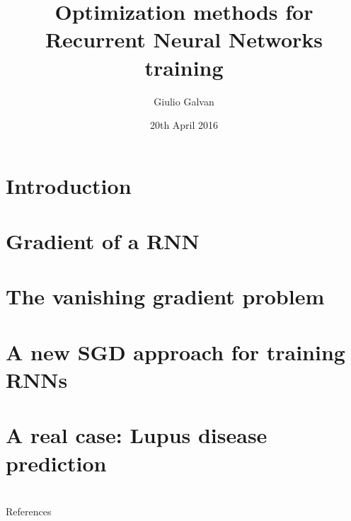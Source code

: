 \documentclass[xcolor=dvipsnames,10pt]{beamer}
\title{Optimization methods for Recurrent Neural Networks training}
\date{20th April 2016}
\author{Giulio Galvan}
\institute{Università degli studi di Firenze}
\begin{document}
\frame{\titlepage}
\section{Introduction}

\section{Gradient of a RNN}

\section{The vanishing gradient problem}

%
\section{A new SGD approach for training RNNs}

\section{A real case: Lupus disease prediction}


\section{}
\begin{frame}[allowframebreaks]{References}
	
	
\end{frame}
\end{document}
